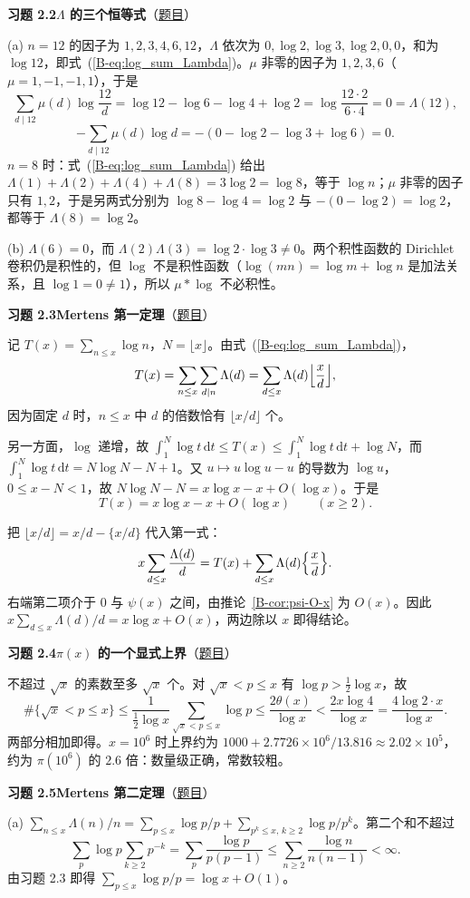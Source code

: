 \documentclass[11pt,a4paper]{article}
\newcommand{\dd}{\,\mathrm{d}}
\newcommand{\bref}[1]{\ref*{B-#1}}
\newcommand{\Sol}[2]{%
  \par\addvspace{1.2em}\noindent
  \hypertarget{s:#1}{}\textbf{习题 #1\quad #2}\hfill{\small（\hyperlink{q:#1}{题目}）}\par
  \nopagebreak\smallskip}
\begin{document}
\Sol{2.2}{$\Lambda$ 的三个恒等式}
(a) $n=12$ 的因子为 $1,2,3,4,6,12$，$\Lambda$ 依次为 $0,\log2,\log3,\log2,0,0$，和为 $\log12$，即式~(\bref{eq:log_sum_Lambda})。$\mu$ 非零的因子为 $1,2,3,6$（$\mu=1,-1,-1,1$），于是
\[
  \sum_{d\mid12}\mu(d)\log\frac{12}d=\log12-\log6-\log4+\log2=\log\frac{12\cdot2}{6\cdot4}=0=\Lambda(12),
\]
\[
  -\sum_{d\mid12}\mu(d)\log d=-(0-\log2-\log3+\log6)=0 .
\]
$n=8$ 时：式~(\bref{eq:log_sum_Lambda}) 给出 $\Lambda(1)+\Lambda(2)+\Lambda(4)+\Lambda(8)=3\log2=\log8$，等于 $\log n$；$\mu$ 非零的因子只有 $1,2$，于是另两式分别为 $\log8-\log4=\log2$ 与 $-(0-\log2)=\log2$，都等于 $\Lambda(8)=\log2$。

(b) $\Lambda(6)=0$，而 $\Lambda(2)\Lambda(3)=\log2\cdot\log3\ne0$。两个积性函数的 Dirichlet 卷积仍是积性的，但 $\log$ 不是积性函数（$\log(mn)=\log m+\log n$ 是加法关系，且 $\log1=0\ne1$），所以 $\mu*\log$ 不必积性。

\Sol{2.3}{Mertens 第一定理}
记 $T(x)=\sum_{n\le x}\log n$，$N=\lfloor x\rfloor$。由式~(\bref{eq:log_sum_Lambda})，
\[
  T(x)=\sum_{n\le x}\sum_{d\mid n}\Lambda(d)=\sum_{d\le x}\Lambda(d)\Bigl\lfloor\frac xd\Bigr\rfloor ,
\]
因为固定 $d$ 时，$n\le x$ 中 $d$ 的倍数恰有 $\lfloor x/d\rfloor$ 个。

另一方面，$\log$ 递增，故 $\int_1^N\log t\dd t\le T(x)\le\int_1^N\log t\dd t+\log N$，而 $\int_1^N\log t\dd t=N\log N-N+1$。又 $u\mapsto u\log u-u$ 的导数为 $\log u$，$0\le x-N<1$，故 $N\log N-N=x\log x-x+O(\log x)$。于是
\[
  T(x)=x\log x-x+O(\log x)\qquad(x\ge2).
\]

把 $\lfloor x/d\rfloor=x/d-\{x/d\}$ 代入第一式：
\[
  x\sum_{d\le x}\frac{\Lambda(d)}d=T(x)+\sum_{d\le x}\Lambda(d)\Bigl\{\frac xd\Bigr\}.
\]
右端第二项介于 $0$ 与 $\psi(x)$ 之间，由推论~\bref{cor:psi-O-x} 为 $O(x)$。因此
$x\sum_{d\le x}\Lambda(d)/d=x\log x+O(x)$，两边除以 $x$ 即得结论。

\Sol{2.4}{$\pi(x)$ 的一个显式上界}
不超过 $\sqrt x$ 的素数至多 $\sqrt x$ 个。对 $\sqrt x<p\le x$ 有 $\log p>\tfrac12\log x$，故
\[
  \#\{\sqrt x<p\le x\}\le\frac{1}{\tfrac12\log x}\sum_{\sqrt x<p\le x}\log p\le\frac{2\theta(x)}{\log x}<\frac{2x\log4}{\log x}=\frac{4\log2\cdot x}{\log x}.
\]
两部分相加即得。$x=10^6$ 时上界约为 $1000+2.7726\times10^6/13.816\approx2.02\times10^5$，约为 $\pi(10^6)$ 的 $2.6$ 倍：数量级正确，常数较粗。

\Sol{2.5}{Mertens 第二定理}
(a) $\sum_{n\le x}\Lambda(n)/n=\sum_{p\le x}\log p/p+\sum_{p^k\le x,\,k\ge2}\log p/p^k$。第二个和不超过
\[
  \sum_p\log p\sum_{k\ge2}p^{-k}=\sum_p\frac{\log p}{p(p-1)}\le\sum_{n\ge2}\frac{\log n}{n(n-1)}<\infty .
\]
由习题 2.3 即得 $\sum_{p\le x}\log p/p=\log x+O(1)$。
\end{document}
